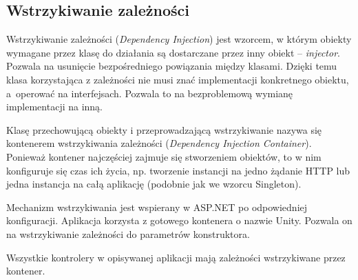 \subsection*{Wstrzykiwanie zależności}

Wstrzykiwanie zależności (\textit{Dependency Injection}) jest wzorcem, w którym obiekty wymagane przez klasę do działania są dostarczane przez inny obiekt -- \textit{injector}. Pozwala na usunięcie bezpośredniego powiązania między klasami\cite{wstrzykiwanie}. Dzięki temu klasa korzystająca z zależności nie musi znać implementacji konkretnego obiektu, a~operować na interfejsach. Pozwala to na bezproblemową wymianę implementacji na inną.

Klasę przechowującą obiekty i przeprowadzającą wstrzykiwanie nazywa się kontenerem wstrzykiwania zależności (\textit{Dependency Injection Container}). Ponieważ kontener najczęściej zajmuje się stworzeniem obiektów, to w nim konfiguruje się czas ich życia, np. tworzenie instancji na jedno żądanie HTTP lub jedna instancja na całą aplikację (podobnie jak we wzorcu Singleton).

Mechanizm wstrzykiwania jest wspierany w ASP.NET po odpowiedniej konfiguracji. Aplikacja korzysta z gotowego kontenera o nazwie Unity. Pozwala on na wstrzykiwanie zależności do parametrów konstruktora.

Wszystkie kontrolery w opisywanej aplikacji mają zależności wstrzykiwane przez kontener.

